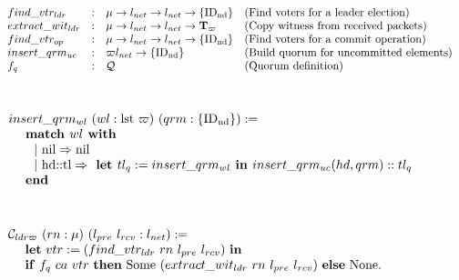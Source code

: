 \begin{figure}
\raggedright
\noindent{} \\
$$
\begin{array}{llll}
find\_vtr_{ldr} &:& \termnum \rightarrow \networklog \rightarrow \networklog \rightarrow  \set{\nodeid} & \mbox{(Find voters for a leader election)}\\
extract\_wit_{ldr} &:& \termnum \rightarrow \networklog \rightarrow \networklog \rightarrow  \witnesstree & \mbox{(Copy witness from received packets)}\\
find\_vtr_{op} &:& \termnum \rightarrow \networklog \rightarrow \networklog \rightarrow  \set{\nodeid} & \mbox{(Find voters for a commit operation)}\\
insert\_qrm_{uc} &:& \witness \networklog \rightarrow  \set{\nodeid} & \mbox{(Build quorum for uncommitted elements)}\\
f_{q} &:&  \isquorums & \mbox{(Quorum definition)}\\
\end{array}
$$
\raggedright
\noindent{}\\
$$
\begin{array}{l}
insert\_qrm_{wl}\ (wl : \text{lst } \witness)\ (qrm:  \set{\nodeid}) :=\\
\ \ \ \  \text{\textbf{match }} wl \text{\textbf{ with}} \\ 
\ \ \ \  \ \ \vert \ \text{nil} \Rightarrow \text{nil} \\
\ \ \ \  \ \   \vert \ \text{hd::tl} \Rightarrow 
 \text{\textbf{ let }} tl_{q} :=  insert\_qrm_{wl} \text{\textbf{ in }} 
insert\_qrm_{uc}(hd, qrm)::tl_{q}  \\
\ \ \ \ \text{\textbf{end}} \\
\end{array}
$$
\raggedright
\noindent{}  \\
$$
\begin{array}{ll}
\ldrwcons \ (rn: \termnum) \ (l_{pre}\ l_{rcv}: \networklog) := \\
\ \ \ \ \mbox{\textbf{let}}\ vtr := (find\_vtr_{ldr} \ rn \ l_{pre} \ l_{rcv})\  \mbox{\textbf{in}} \\ 
\ \ \ \ \mbox{\textbf{if}} \ f_{q} \ ca \ vtr \ \mbox{\textbf{then}}\
  \text{Some}\ (extract\_wit_{ldr} \ rn \ l_{pre} \ l_{rcv})\   \mbox{\textbf{else}} \  \text{None}.\\
\\

\end{array}$$
\end{figure}
